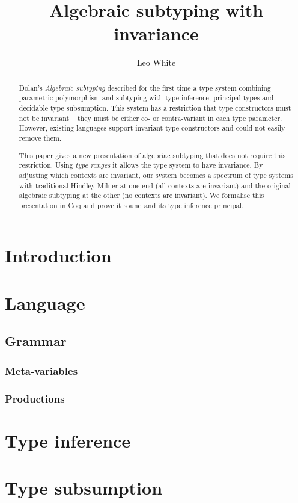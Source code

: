 \documentclass{article}
\title{Algebraic subtyping with invariance}
\author{Leo White}
\date{}
\begin{document}
\maketitle
\begin{abstract}
  Dolan's \emph{Algebraic subtyping} described for the first time a type
  system combining parametric polymorphism and subtyping with type
  inference, principal types and decidable type subsumption. This system
  has a restriction that type constructors must not be invariant -- they
  must be either co- or contra-variant in each type parameter. However,
  existing languages support invariant type constructors and could not
  easily remove them.

  This paper gives a new presentation of algebriac subtyping that does
  not require this restriction. Using \emph{type ranges} it allows the
  type system to have invariance. By adjusting which contexts are
  invariant, our system becomes a spectrum of type systems with
  traditional Hindley-Milner at one end (all contexts are invariant) and
  the original algebraic subtyping at the other (no contexts are
  invariant). We formalise this presentation in Coq and prove it sound
  and its type inference principal.
\end{abstract}

\section{Introduction}

\section{Language}
\subsection{Grammar}
\subsubsection{Meta-variables}
\ottmetavars
\subsubsection{Productions}
\ottgrammar

\section{Type inference}

\section{Type subsumption}
\end{document}
